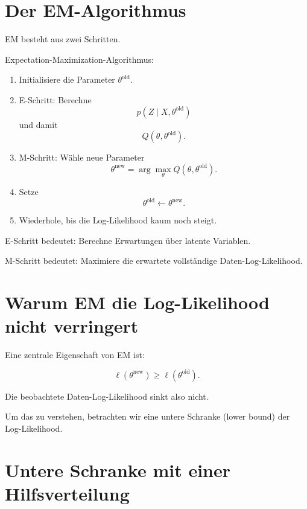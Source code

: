 \section{Der EM-Algorithmus}

EM besteht aus zwei Schritten.

\begin{definitionbox}
Expectation-Maximization-Algorithmus:

\begin{enumerate}
    \item Initialisiere die Parameter \(\theta^{\mathrm{old}}\).
    \item E-Schritt:
    Berechne
    \[
        p(Z\mid X,\theta^{\mathrm{old}})
    \]
    und damit
    \[
        Q(\theta,\theta^{\mathrm{old}}).
    \]
    \item M-Schritt:
    Wähle neue Parameter
    \[
        \theta^{\mathrm{new}}
        =
        \arg\max_{\theta}
        Q(\theta,\theta^{\mathrm{old}}).
    \]
    \item Setze
    \[
        \theta^{\mathrm{old}}
        \leftarrow
        \theta^{\mathrm{new}}.
    \]
    \item Wiederhole, bis die Log-Likelihood kaum noch steigt.
\end{enumerate}
\end{definitionbox}

\begin{conceptbox}
E-Schritt bedeutet:
Berechne Erwartungen über latente Variablen.

M-Schritt bedeutet:
Maximiere die erwartete vollständige Daten-Log-Likelihood.
\end{conceptbox}

\section{Warum EM die Log-Likelihood nicht verringert}

Eine zentrale Eigenschaft von EM ist:

\[
    \ell(\theta^{\mathrm{new}})
    \geq
    \ell(\theta^{\mathrm{old}}).
\]

Die beobachtete Daten-Log-Likelihood sinkt also nicht.

Um das zu verstehen, betrachten wir eine untere Schranke (lower bound) der Log-Likelihood.

\section{Untere Schranke mit einer Hilfsverteilung}

